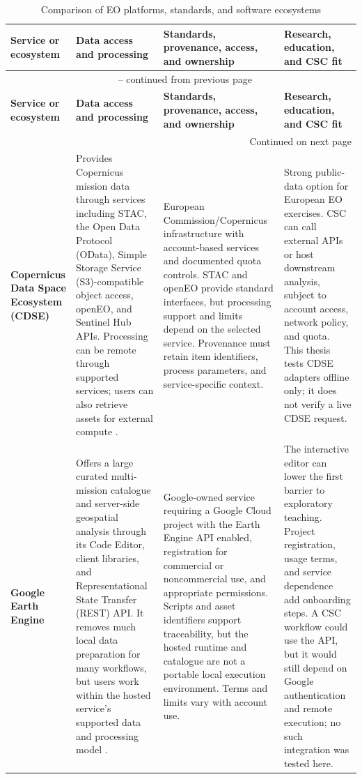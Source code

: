 \small
\begin{longtable}{p{}p{}p{}p{}}
\caption{Comparison of EO platforms, standards, and software ecosystems}
\label{tab:eo-platforms}\\
\toprule
\textbf{Service or ecosystem} &
\textbf{Data access and processing} &
\textbf{Standards, provenance, access, and ownership} &
\textbf{Research, education, and CSC fit} \\
\midrule
\endfirsthead
\multicolumn{4}{c}{\tablename\ \thetable{} -- continued from previous page}\\
\toprule
\textbf{Service or ecosystem} &
\textbf{Data access and processing} &
\textbf{Standards, provenance, access, and ownership} &
\textbf{Research, education, and CSC fit} \\
\midrule
\endhead
\midrule
\multicolumn{4}{r}{Continued on next page}\\
\endfoot
\bottomrule
\endlastfoot

\textbf{Copernicus Data Space Ecosystem (CDSE)} &
Provides Copernicus mission data through services including STAC, the Open Data Protocol
(OData), Simple Storage Service (S3)-compatible object access, openEO, and
Sentinel Hub APIs. Processing can be remote through supported services; users can also retrieve
assets for external compute \citep{cdse,cdse-quotas,kovacs2026cdse}. &
European Commission/Copernicus infrastructure with account-based services and documented
quota controls. STAC and openEO provide standard interfaces, but processing support and limits
depend on the selected service. Provenance must retain item identifiers, process parameters,
and service-specific context. &
Strong public-data option for European EO exercises. CSC can call external APIs or host
downstream analysis, subject to account access, network policy, and quota. This thesis tests
CDSE adapters offline only; it does not verify a live CDSE request. \\

\textbf{Google Earth Engine} &
Offers a large curated multi-mission catalogue and server-side geospatial analysis through its
Code Editor, client libraries, and Representational State Transfer (REST) API. It removes much local data preparation for many
workflows, but users work within the hosted service's supported data and processing model
\citep{gee-paper,gee-access}. &
Google-owned service requiring a Google Cloud project with the Earth Engine API enabled,
registration for commercial or noncommercial use, and appropriate permissions. Scripts and
asset identifiers support traceability, but the hosted runtime and catalogue are not a
portable local execution environment. Terms and limits vary with account use. &
The interactive editor can lower the first barrier to exploratory teaching. Project
registration, usage terms, and service dependence add onboarding steps. A CSC workflow could
use the API, but it would still depend on Google authentication and remote execution; no such
integration was tested here. \\


\end{longtable}
